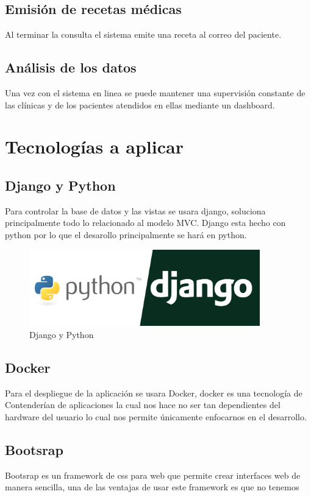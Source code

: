 \documentclass[11pt]{article}
\begin{document}
\subsection{Emisión de recetas médicas}
\label{sec:orgc3770c2}
Al terminar la consulta el sistema emite una receta al correo del paciente.

\subsection{Análisis de los datos}
\label{sec:orgde89aa1}
Una vez con el sistema en linea se puede mantener una supervisión constante de 
las clínicas y de los pacientes atendidos en ellas mediante un dashboard.


\pagebreak

\section{Tecnologías a aplicar}
\label{sec:org1a083be}
\subsection{Django y Python}
\label{sec:orgb9e9f1d}
Para controlar la base de datos y las vistas se usara django, soluciona 
principalmente todo lo relacionado al modelo MVC. Django esta hecho con python
por lo que el desarollo principalmente se hará en python. 

\begin{figure}[htbp]
\centering
\includegraphics[width=10cm]{img/python-django.png}
\caption{Django y Python}
\end{figure}

\subsection{Docker}
\label{sec:org24ee138}
Para el despliegue de la aplicación se usara Docker, docker es una tecnología 
de Contenderían de aplicaciones la cual nos hace no ser tan dependientes 
del hardware del usuario lo cual nos permite únicamente enfocarnos en el 
desarrollo. 

\subsection{Bootsrap}
\label{sec:org7da8b2f}
Bootsrap es un framework de css para web que permite crear interfaces web de 
manera sencilla, una de las ventajas de usar este framework es que no tenemos 
\end{document}
